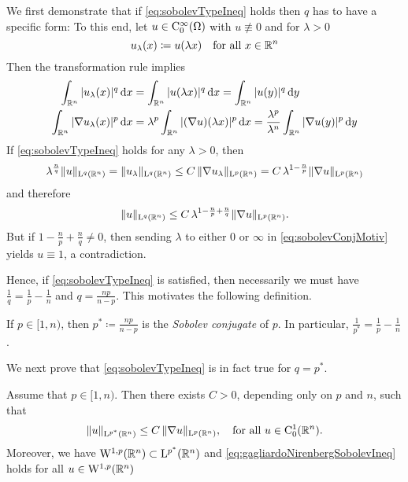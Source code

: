\begin{motiv}
  We first demonstrate that if \eqref{eq:sobolevTypeIneq} holds then $q$ has to have a specific form:
  To this end, let $u \in \mathrm{C}_0^\infty(\Omega)$ with $u \not\equiv 0$ and for $\lambda > 0$
  $$
  u_\lambda(x) \coloneqq u(\lambda x) \quad\text{for all } x \in \mathbb{R}^n
  $$
  Then the transformation rule implies
  \begin{align*}
    \int_{\mathbb{R}^n} |u_\lambda(x)|^q \, {\operatorname{d}\!{x}} &= \int_{\mathbb{R}^n} |u(\lambda x)|^q \, {\operatorname{d}\!{x}} = \int_{\mathbb{R}^n} |u(y)|^q \, {\operatorname{d}\!{y}} \\
    \int_{\mathbb{R}^n} |\nabla u_\lambda(x) |^p \, {\operatorname{d}\!{x}} &= \lambda^p \int_{\mathbb{R}^n} |(\nabla u)(\lambda x)|^p \, {\operatorname{d}\!{x}} = \frac{\lambda^p}{\lambda^n} \int_{\mathbb{R}^n} |\nabla u(y)|^p \, {\operatorname{d}\!{y}}
  \end{align*}
  If \eqref{eq:sobolevTypeIneq} holds for any $\lambda > 0$, then 
  $$
  \lambda^{\frac{n}{q}} \| u\|_{\mathrm{L}^q(\mathbb{R}^n)}
  = \| u_\lambda\|_{\mathrm{L}^q(\mathbb{R}^n)}
  \leq C \, \|\nabla u_\lambda\|_{\mathrm{L}^p(\mathbb{R}^n)}
  = C \, \lambda^{1 - \frac{n}{p}} \| \nabla u \|_{\mathrm{L}^p(\mathbb{R}^n)}
  $$
  and therefore
  \begin{equation}
    \label{eq:sobolevConjMotiv}
    \|u \|_{\mathrm{L}^q(\mathbb{R}^n)} \leq C \, \lambda^{1 - \frac{n}{p} + \frac{n}{q}} \|\nabla u\|_{\mathrm{L}^p(\mathbb{R}^n)}.
  \end{equation}
  But if $1 - \frac{n}{p} + \frac{n}{q} \neq 0$, then sending $\lambda$ to either $0$ or $\infty$ in \eqref{eq:sobolevConjMotiv} yields $u \equiv 1$, a contradiction.

  Hence, if \eqref{eq:sobolevTypeIneq} is satisfied, then necessarily we must have $\frac{1}{q} = \frac{1}{p} - \frac{1}{n}$ and $q = \frac{n p }{n - p}$.
  This motivates the following definition.
\end{motiv}

\begin{defn}
  If $p \in [1,n)$, then $p^* \coloneqq \frac{np}{n - p}$ is the \emph{Sobolev conjugate} of $p$.
  In particular, $\frac{1}{p^*} = \frac{1}{p} - \frac{1}{n}$.
\end{defn}

We next prove that \eqref{eq:sobolevTypeIneq} is in fact true for $q = p^*$.

\begin{thm}
  \label{thm:gagliardoNirenberg}
  Assume that $p \in [1,n)$.
  Then there exists $C > 0$, depending only on $p$ and $n$, such that
  \begin{equation}
    \label{eq:gagliardoNirenbergSobolevIneq}
    \| u\|_{\mathrm{L}^{p^*}(\mathbb{R}^n)} \leq C \, \|\nabla u\|_{\mathrm{L}^p(\mathbb{R}^n)}, \quad\text{for all } u \in \mathrm{C}_0^1(\mathbb{R}^n).
  \end{equation}
  Moreover, we have $\mathrm{W}^{1,p}(\mathbb{R}^n) \subset \mathrm{L}^{p^*}(\mathbb{R}^n)$ and \eqref{eq:gagliardoNirenbergSobolevIneq} holds for all $u \in \mathrm{W}^{1,p}(\mathbb{R}^n)$
\end{thm}

